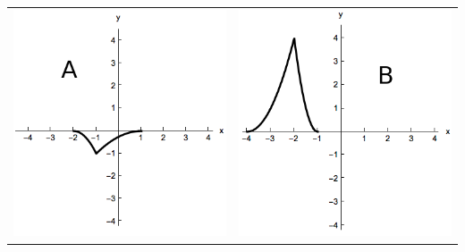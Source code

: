 \documentclass{ximera}
\begin{document}
\begin{exercise}
\begin{center}
\begin{tabular}{cc}
\includegraphics{transGraphA.png} & \includegraphics{transGraphB.png}\\

\end{tabular}
\end{center}
\end{exercise}
\end{document}
